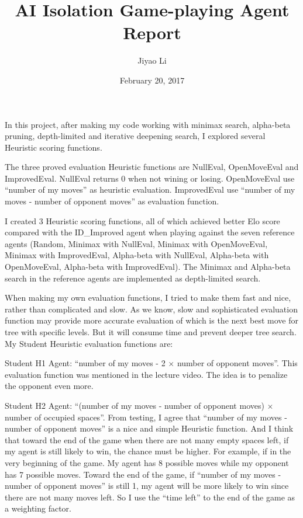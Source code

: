 \documentclass[11pt, letterpaper]{article}
\title{AI Isolation Game-playing Agent Report}
\author{Jiyao Li}
\date{February 20, 2017}
\begin{document}
	\maketitle 
	
In this project, after making my code working with minimax search, alpha-beta pruning, depth-limited and iterative deepening search, I explored several Heuristic scoring functions. 

The three proved evaluation Heuristic functions are NullEval, OpenMoveEval and ImprovedEval. NullEval returns 0 when not wining or losing. OpenMoveEval use ``number of my moves'' as heuristic evaluation. ImprovedEval use ``number of my moves - number of opponent moves'' as evaluation function.

I created 3 Heuristic scoring functions, all of which achieved better Elo score compared with the ID\_Improved agent when playing against the seven reference agents (Random, Minimax with NullEval, Minimax with OpenMoveEval, Minimax with ImprovedEval, Alpha-beta with NullEval, Alpha-beta with OpenMoveEval, Alpha-beta with ImprovedEval). The Minimax and Alpha-beta search in the reference agents are implemented as depth-limited search. 

When making my own evaluation functions, I tried to make them fast and nice, rather than complicated and slow. As we know, slow and sophisticated evaluation function may provide more accurate evaluation of which is the next best move for tree with specific levels. But it will consume time and prevent deeper tree search. My Student Heuristic evaluation functions are:

Student H1 Agent: ``number of my moves - 2 $\times$ number of opponent moves''. This evaluation function was mentioned in the lecture video. The idea is to penalize the opponent even more. 

Student H2 Agent: ``(number of my moves - number of opponent moves) $\times$ number of occupied spaces''. From testing, I agree that ``number of my moves - number of opponent moves'' is a nice and simple Heuristic function. And I think that toward the end of the game when there are not many empty spaces left, if my agent is still likely to win, the chance must be higher. For example, if in the very beginning of the game. My agent has 8 possible moves while my opponent has 7 possible moves. Toward the end of the game, if ``number of my moves - number of opponent moves'' is still 1, my agent will be more likely to win since there are not many moves left. So I use the ``time left'' to the end of the game as a weighting factor.
\end{document}
